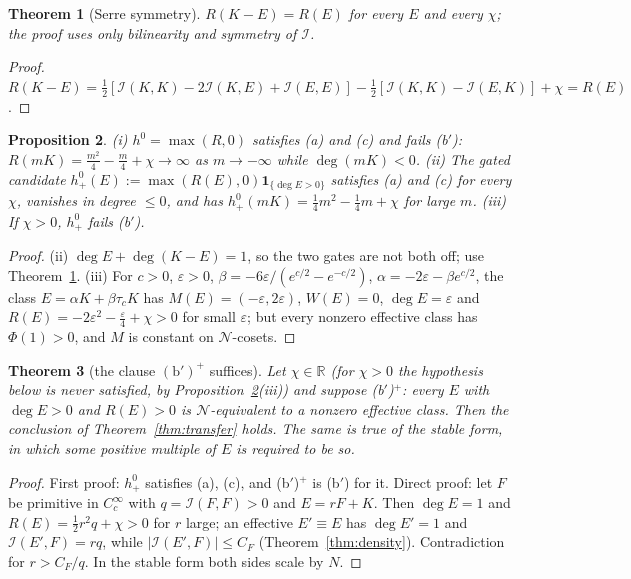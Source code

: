 \documentclass[11pt]{amsart}
\newtheorem{theorem}{Theorem}[section]
\newtheorem{proposition}[theorem]{Proposition}
\theoremstyle{definition}
\theoremstyle{remark}
\newcommand{\R}{\mathbb R}
\newcommand{\Nr}{\mathcal N}
\newcommand{\I}{\mathcal I}
\newcommand{\dg}{\deg}
\begin{document}
\begin{theorem}[Serre symmetry]\label{thm:serre}
$R(K-E)=R(E)$ for every $E$ and every $\chi$; the proof uses only bilinearity and symmetry of $\I$.
\end{theorem}
\begin{proof}
$R(K-E)=\frac12[\I(K,K)-2\I(K,E)+\I(E,E)]-\frac12[\I(K,K)-\I(E,K)]+\chi=R(E)$.
\end{proof}

\begin{proposition}\label{prop:gated}
(i) $h^0=\max(R,0)$ satisfies (a) and (c) and fails (b$'$): $R(mK)=\frac{m^2}4-\frac m4+\chi\to\infty$ as
$m\to-\infty$ while $\dg(mK)<0$.
(ii) The gated candidate $h^0_+(E):=\max(R(E),0)\mathbf 1_{\{\dg E>0\}}$ satisfies (a) and (c) for every $\chi$,
vanishes in degree $\le0$, and has $h^0_+(mK)=\frac14m^2-\frac14m+\chi$ for large $m$.
(iii) If $\chi>0$, $h^0_+$ fails (b$'$).
\end{proposition}
\begin{proof}
(ii) $\dg E+\dg(K-E)=1$, so the two gates are not both off; use Theorem~\ref{thm:serre}.
(iii) For $c>0$, $\varepsilon>0$, $\beta=-6\varepsilon/(e^{c/2}-e^{-c/2})$, $\alpha=-2\varepsilon-\beta e^{c/2}$, the class
$E=\alpha K+\beta\tau_cK$ has $M(E)=(-\varepsilon,2\varepsilon)$, $W(E)=0$, $\dg E=\varepsilon$ and
$R(E)=-2\varepsilon^2-\frac\varepsilon4+\chi>0$ for small $\varepsilon$; but every nonzero effective class has
$\Phi(1)>0$, and $M$ is constant on $\Nr$-cosets.
\end{proof}

\begin{theorem}[the clause $(\mathrm b')^+$ suffices]\label{thm:bplus}
Let $\chi\in\R$ (for $\chi>0$ the hypothesis below is never satisfied, by
Proposition~\ref{prop:gated}(iii)) and suppose
\textup{(b$'$)$^+$}: every $E$ with $\dg E>0$ and $R(E)>0$ is $\Nr$-equivalent to a nonzero effective class.
Then the conclusion of Theorem~\ref{thm:transfer} holds. The same is true of the stable form, in which
some positive multiple of $E$ is required to be so.
\end{theorem}
\begin{proof}
First proof: $h^0_+$ satisfies (a), (c), and (b$'$)$^+$ is (b$'$) for it. Direct proof: let $F$ be primitive in
$C_c^\infty$ with $q=\I(F,F)>0$ and $E=rF+K$. Then $\dg E=1$ and $R(E)=\frac12r^2q+\chi>0$ for $r$ large;
an effective $E'\equiv E$ has $\dg E'=1$ and $\I(E',F)=rq$, while $|\I(E',F)|\le C_F$
(Theorem~\ref{thm:density}). Contradiction for $r>C_F/q$. In the stable form both sides scale by $N$.
\end{proof}
\end{document}
